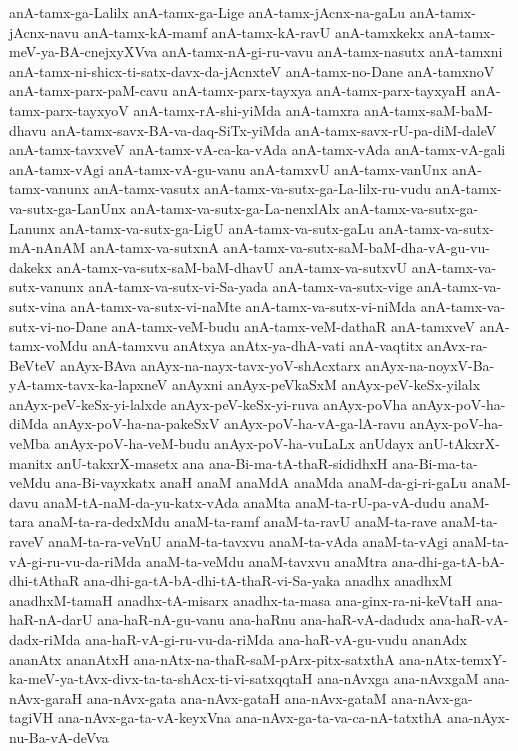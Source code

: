{anA-tamx-ga-Lalilx
anA-tamx-ga-Lige
anA-tamx-jAcnx-na-gaLu
anA-tamx-jAcnx-navu
anA-tamx-kA-mamf
anA-tamx-kA-ravU
anA-tamxkekx
anA-tamx-meV-ya-BA-cnejxyXVva
anA-tamx-nA-gi-ru-vavu
anA-tamx-nasutx
anA-tamxni
anA-tamx-ni-shicx-ti-satx-davx-da-jAcnxteV
anA-tamx-no-Dane
anA-tamxnoV
anA-tamx-parx-paM-cavu
anA-tamx-parx-tayxya
anA-tamx-parx-tayxyaH
anA-tamx-parx-tayxyoV
anA-tamx-rA-shi-yiMda
anA-tamxra
anA-tamx-saM-baM-dhavu
anA-tamx-savx-BA-va-daq-SiTx-yiMda
anA-tamx-savx-rU-pa-diM-daleV
anA-tamx-tavxveV
anA-tamx-vA-ca-ka-vAda
anA-tamx-vAda
anA-tamx-vA-gali
anA-tamx-vAgi
anA-tamx-vA-gu-vanu
anA-tamxvU
anA-tamx-vanUnx
anA-tamx-vanunx
anA-tamx-vasutx
anA-tamx-va-sutx-ga-La-lilx-ru-vudu
anA-tamx-va-sutx-ga-LanUnx
anA-tamx-va-sutx-ga-La-nenxlAlx
anA-tamx-va-sutx-ga-Lanunx
anA-tamx-va-sutx-ga-LigU
anA-tamx-va-sutx-gaLu
anA-tamx-va-sutx-mA-nAnAM
anA-tamx-va-sutxnA
anA-tamx-va-sutx-saM-baM-dha-vA-gu-vu-dakekx
anA-tamx-va-sutx-saM-baM-dhavU
anA-tamx-va-sutxvU
anA-tamx-va-sutx-vanunx
anA-tamx-va-sutx-vi-Sa-yada
anA-tamx-va-sutx-vige
anA-tamx-va-sutx-vina
anA-tamx-va-sutx-vi-naMte
anA-tamx-va-sutx-vi-niMda
anA-tamx-va-sutx-vi-no-Dane
anA-tamx-veM-budu
anA-tamx-veM-dathaR
anA-tamxveV
anA-tamx-voMdu
anA-tamxvu
anAtxya
anAtx-ya-dhA-vati
anA-vaqtitx
anAvx-ra-BeVteV
anAyx-BAva
anAyx-na-nayx-tavx-yoV-shAcxtarx
anAyx-na-noyxV-Ba-yA-tamx-tavx-ka-lapxneV
anAyxni
anAyx-peVkaSxM
anAyx-peV-keSx-yilalx
anAyx-peV-keSx-yi-lalxde
anAyx-peV-keSx-yi-ruva
anAyx-poVha
anAyx-poV-ha-diMda
anAyx-poV-ha-na-pakeSxV
anAyx-poV-ha-vA-ga-lA-ravu
anAyx-poV-ha-veMba
anAyx-poV-ha-veM-budu
anAyx-poV-ha-vuLaLx
anUdayx
anU-tAkxrX-manitx
anU-takxrX-masetx
ana
ana-Bi-ma-tA-thaR-sididhxH
ana-Bi-ma-ta-veMdu
ana-Bi-vayxkatx
anaH
anaM
anaMdA
anaMda
anaM-da-gi-ri-gaLu
anaM-davu
anaM-tA-naM-da-yu-katx-vAda
anaMta
anaM-ta-rU-pa-vA-dudu
anaM-tara
anaM-ta-ra-dedxMdu
anaM-ta-ramf
anaM-ta-ravU
anaM-ta-rave
anaM-ta-raveV
anaM-ta-ra-veVnU
anaM-ta-tavxvu
anaM-ta-vAda
anaM-ta-vAgi
anaM-ta-vA-gi-ru-vu-da-riMda
anaM-ta-veMdu
anaM-tavxvu
anaMtra
ana-dhi-ga-tA-bA-dhi-tAthaR
ana-dhi-ga-tA-bA-dhi-tA-thaR-vi-Sa-yaka
anadhx
anadhxM
anadhxM-tamaH
anadhx-tA-misarx
anadhx-ta-masa
ana-ginx-ra-ni-keVtaH
ana-haR-nA-darU
ana-haR-nA-gu-vanu
ana-haRnu
ana-haR-vA-dadudx
ana-haR-vA-dadx-riMda
ana-haR-vA-gi-ru-vu-da-riMda
ana-haR-vA-gu-vudu
ananAdx
ananAtx
ananAtxH
ana-nAtx-na-thaR-saM-pArx-pitx-satxthA
ana-nAtx-temxY-ka-meV-ya-tAvx-divx-ta-ta-shAcx-ti-vi-satxqqtaH
ana-nAvxga
ana-nAvxgaM
ana-nAvx-garaH
ana-nAvx-gata
ana-nAvx-gataH
ana-nAvx-gataM
ana-nAvx-ga-tagiVH
ana-nAvx-ga-ta-vA-keyxVna
ana-nAvx-ga-ta-va-ca-nA-tatxthA
ana-nAyx-nu-Ba-vA-deVva
}
